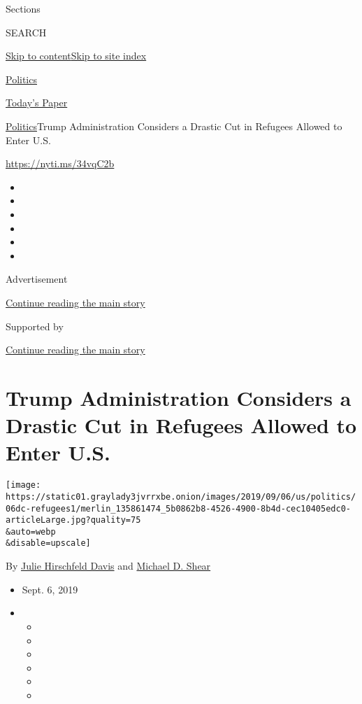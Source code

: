 Sections

SEARCH

\protect\hyperlink{site-content}{Skip to
content}\protect\hyperlink{site-index}{Skip to site index}

\href{https://www.nytimes3xbfgragh.onion/section/politics}{Politics}

\href{https://myaccount.nytimes3xbfgragh.onion/auth/login?response_type=cookie\&client_id=vi}{}

\href{https://www.nytimes3xbfgragh.onion/section/todayspaper}{Today's
Paper}

\href{/section/politics}{Politics}\textbar{}Trump Administration
Considers a Drastic Cut in Refugees Allowed to Enter U.S.

\url{https://nyti.ms/34vqC2b}

\begin{itemize}
\item
\item
\item
\item
\item
\item
\end{itemize}

Advertisement

\protect\hyperlink{after-top}{Continue reading the main story}

Supported by

\protect\hyperlink{after-sponsor}{Continue reading the main story}

\hypertarget{trump-administration-considers-a-drastic-cut-in-refugees-allowed-to-enter-us}{%
\section{Trump Administration Considers a Drastic Cut in Refugees
Allowed to Enter
U.S.}\label{trump-administration-considers-a-drastic-cut-in-refugees-allowed-to-enter-us}}

\texttt{[image: https://static01.graylady3jvrrxbe.onion/images/2019/09/06/us/politics/06dc-refugees1/merlin\_135861474\_5b0862b8-4526-4900-8b4d-cec10405edc0-articleLarge.jpg?quality=75\\\&auto=webp\\\&disable=upscale]}

By
\href{https://www.nytimes3xbfgragh.onion/by/julie-hirschfeld-davis}{Julie
Hirschfeld Davis} and
\href{https://www.nytimes3xbfgragh.onion/by/michael-d-shear}{Michael D.
Shear}

\begin{itemize}
\item
  Sept. 6, 2019
\item
  \begin{itemize}
  \item
  \item
  \item
  \item
  \item
  \item
  \end{itemize}
\end{itemize}

